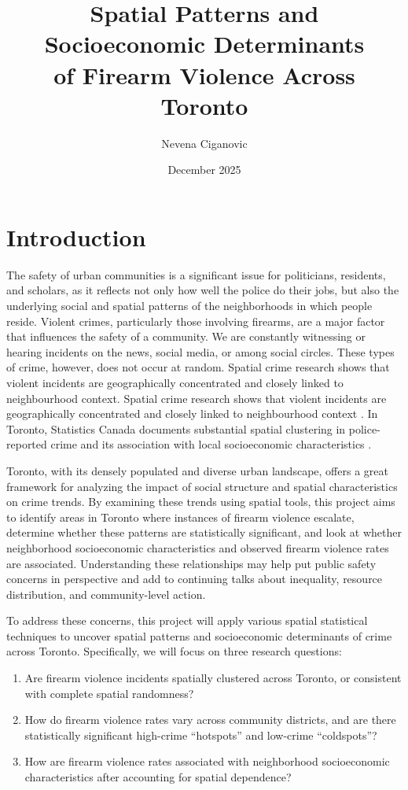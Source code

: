 \documentclass{article}
\title{\textbf{Spatial Patterns and Socioeconomic Determinants\\ of Firearm Violence Across Toronto}}
\author{Nevena Ciganovic}
\date{December 2025}
\begin{document}
\maketitle

\section{Introduction}

\noindent The safety of urban communities is a significant issue for politicians, residents, and scholars, as it reflects not only how well the police do their jobs, but also the underlying social and spatial patterns of the neighborhoods in which people reside. Violent crimes, particularly those involving firearms, are a major factor that influences the safety of a community. We are constantly witnessing or hearing incidents on the news, social media, or among social circles. These types of crime, however, does not occur at random. Spatial crime research shows that violent incidents are geographically concentrated and closely linked to neighbourhood context. Spatial crime research shows that violent incidents are geographically concentrated and closely linked to neighbourhood context \citep{liu2016changchun,zhou2023london}. In Toronto, Statistics Canada documents substantial spatial clustering in police-reported crime and its association with local socioeconomic characteristics \citep{charron2009toronto}.


\noindent Toronto, with its densely populated and diverse urban landscape, offers a great framework for analyzing the impact of social structure and spatial characteristics on crime trends. By examining these trends using spatial tools, this project aims to identify areas in Toronto where instances of firearm violence escalate, determine whether these patterns are statistically significant, and look at whether neighborhood socioeconomic characteristics and observed firearm violence rates are associated. Understanding these relationships may help put public safety concerns in perspective and add to continuing talks about inequality, resource distribution, and community-level action.

\noindent To address these concerns, this project will apply various spatial statistical techniques to uncover spatial patterns and socioeconomic determinants of crime across Toronto. Specifically, we will focus on three research questions:

\begin{enumerate}
    \item Are firearm violence incidents spatially clustered across Toronto, or consistent with complete spatial randomness?
    \item How do firearm violence rates vary across community districts, and are there statistically significant high-crime “hotspots” and low-crime “coldspots”?
    \item How are firearm violence rates associated with neighborhood socioeconomic characteristics after accounting for spatial dependence?
\end{enumerate}
\end{document}
